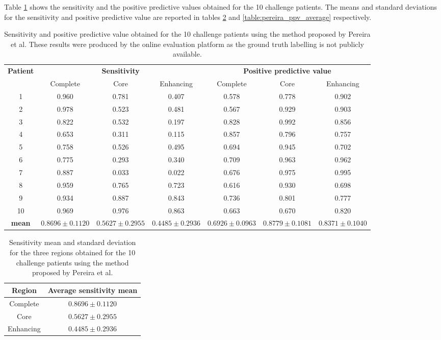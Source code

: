 \documentclass[12pt,a4paper,twoside,openright]{report}
\begin{document}
Table \ref{table:pereira_other_results} shows the sensitivity and the positive predictive values obtained for the 10 challenge patients. The means and standard deviations for the sensitivity and positive predictive value are reported in tables \ref{table:pereira_sensitivity_average} and \ref{table:pereira_ppv_average} respectively.
\begin{table}[h]
\centering	
\label{table:pereira_other_results}
\begin{tabular}{ c | c c c | c c c} 
\multirow{2}{*}{\textbf{Patient}} & \multicolumn{3}{c|}{\textbf{Sensitivity}} & \multicolumn{3}{c}{\textbf{Positive predictive value}}\\
 & Complete & Core & Enhancing & Complete & Core & Enhancing \\
\hline
1 & 0.960 &	0.781 & 0.407 & 0.578 & 0.778 & 0.902 \\
2 & 0.978 & 0.523 & 0.481 & 0.567 & 0.929 & 0.903 \\
3 & 0.822 & 0.532 & 0.197 &	0.828 & 0.992 & 0.856 \\
4 & 0.653 & 0.311 & 0.115 & 0.857 & 0.796 & 0.757 \\ 
5 & 0.758 & 0.526 & 0.495 & 0.694 & 0.945 & 0.702 \\
6 & 0.775 & 0.293 & 0.340 & 0.709 & 0.963 & 0.962 \\
7 & 0.887 & 0.033 & 0.022 & 0.676 & 0.975 & 0.995 \\
8 & 0.959 & 0.765 & 0.723 & 0.616 & 0.930 & 0.698 \\
9 & 0.934 & 0.887 & 0.843 & 0.736 & 0.801 & 0.777 \\
10 & 0.969 & 0.976 & 0.863 & 0.663 & 0.670 & 0.820 \\
\hline
\textbf{mean} &	$0.8696 \pm 0.1120$ & $0.5627 \pm 0.2955$ & $0.4485  \pm 0.2936$ & $0.6926 \pm 0.0963$ & $0.8779 \pm 0.1081$ & $0.8371  \pm 0.1040$ \\
\end{tabular}

\caption{Sensitivity and positive predictive value obtained for the 10 challenge patients using the method proposed by Pereira et al. These results were produced by the online evaluation platform as the ground truth labelling is not publicly available.}
\end{table}

\begin{table}[h]
\centering	
\label{table:pereira_sensitivity_average}
\begin{tabular}{ c | c } 
\textbf{Region} & \textbf{Average sensitivity mean} \\
 \hline
Complete &	$0.8696 \pm 0.1120$ \\
Core & 		$0.5627 \pm 0.2955$ \\
Enhancing & $0.4485  \pm 0.2936$ \\
\end{tabular}
\caption{Sensitivity mean and standard deviation for the three regions obtained for the 10 challenge patients using the method proposed by Pereira et al.}
\end{table}
\end{document}
